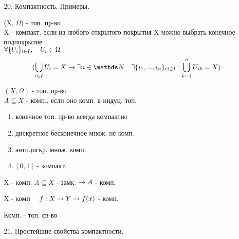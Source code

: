 \documentclass[11pt, fleqn]{article}
\begin{document}
    \begin{question}{20. Компактность. Примеры.}
        \begin{definition} 
            (X, $\Omega$) - топ. пр-во\\
            X - компакт, если из любого открытого покрытия X можно выбрать конечное подпокрытие\\
            $\forall \{U_i\}_{i \in I},\quad U_i \in \Omega$\\
            \[(\bigcup_{i \in I}U_i = X \ra \exists n \in \N \q \exists \{i_1, ..., i_n\}_{ij \in I}:
            \bigcup_{k = 1}^n U_{ik} = X)\] 
        \end{definition}

        \begin{definition} 
            $(X, \Omega)$ - топ. пр-во\\
            $A \subseteq X$ - комп., если оно комп. в индуц. топ.
        \end{definition}

        \begin{theorem} 
            \begin{enumerate}
                \item конечное топ. пр-во всегда компактно
                \item дискретное бесконечное множ. не комп.
                \item антидискр. множ. комп.
                \item  $[0, 1]$ - компакт.
            \end{enumerate}
        \end{theorem}

        \begin{theorem} 
            X - комп. $A \subseteq X$ - замк. $\rightarrow A$ - комп.
        \end{theorem}

        \begin{theorem} 
            X - комп $\quad f:X \rightarrow Y \rightarrow f(x)$ - комп.
        \end{theorem}

        \begin{consequence} 
            Комп. - топ. св-во
        \end{consequence}
    \end{question}

    \begin{question}{21. Простейшие свойства компактности.}
        
    \end{question}
\end{document}
